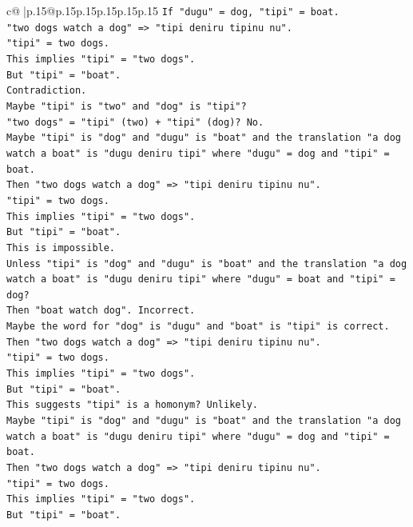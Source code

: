 \documentclass{article}
\begin{document}
{\begin{supertabular}{c@{$\;$}|p{.15\linewidth}@{}p{.15\linewidth}p{.15\linewidth}p{.15\linewidth}p{.15\linewidth}p{.15\linewidth}}
{{{\texttt{If "dugu" = dog, "tipi" = boat.} \\
\texttt{"two dogs watch a dog" => "tipi deniru tipinu nu".} \\
\texttt{"tipi" = two dogs.} \\
\texttt{This implies "tipi" = "two dogs".} \\
\texttt{But "tipi" = "boat".} \\
\texttt{Contradiction.} \\
\texttt{Maybe "tipi" is "two" and "dog" is "tipi"?} \\
\texttt{"two dogs" = "tipi" (two) + "tipi" (dog)? No.} \\
\texttt{Maybe "tipi" is "dog" and "dugu" is "boat" and the translation "a dog watch a boat" is "dugu deniru tipi" where "dugu" = dog and "tipi" = boat.} \\
\texttt{Then "two dogs watch a dog" => "tipi deniru tipinu nu".} \\
\texttt{"tipi" = two dogs.} \\
\texttt{This implies "tipi" = "two dogs".} \\
\texttt{But "tipi" = "boat".} \\
\texttt{This is impossible.} \\
\texttt{Unless "tipi" is "dog" and "dugu" is "boat" and the translation "a dog watch a boat" is "dugu deniru tipi" where "dugu" = boat and "tipi" = dog?} \\
\texttt{Then "boat watch dog". Incorrect.} \\
\texttt{Maybe the word for "dog" is "dugu" and "boat" is "tipi" is correct.} \\
\texttt{Then "two dogs watch a dog" => "tipi deniru tipinu nu".} \\
\texttt{"tipi" = two dogs.} \\
\texttt{This implies "tipi" = "two dogs".} \\
\texttt{But "tipi" = "boat".} \\
\texttt{This suggests "tipi" is a homonym? Unlikely.} \\
\texttt{Maybe "tipi" is "dog" and "dugu" is "boat" and the translation "a dog watch a boat" is "dugu deniru tipi" where "dugu" = dog and "tipi" = boat.} \\
\texttt{Then "two dogs watch a dog" => "tipi deniru tipinu nu".} \\
\texttt{"tipi" = two dogs.} \\
\texttt{This implies "tipi" = "two dogs".} \\
\texttt{But "tipi" = "boat".} \\
}}}
\end{supertabular}}
\end{document}
